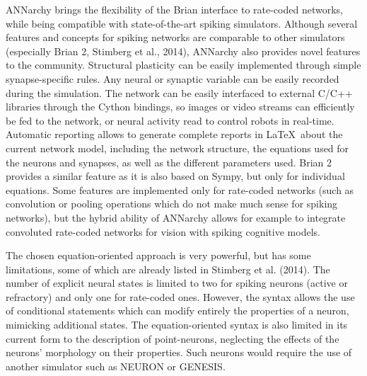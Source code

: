 \documentclass[
  11pt,
  a4paper,
]{scrbook}
\begin{document}
ANNarchy brings the flexibility of the Brian interface to rate-coded
networks, while being compatible with state-of-the-art spiking
simulators. Although several features and concepts for spiking networks
are comparable to other simulators (especially Brian 2, Stimberg et al.,
2014), ANNarchy also provides novel features to the community.
Structural plasticity can be easily implemented through simple
synapse-specific rules. Any neural or synaptic variable can be easily
recorded during the simulation. The network can be easily interfaced to
external C/C++ libraries through the Cython bindings, so images or video
streams can efficiently be fed to the network, or neural activity read
to control robots in real-time. Automatic reporting allows to generate
complete reports in \LaTeX~about the current network model, including
the network structure, the equations used for the neurons and synapses,
as well as the different parameters used. Brian 2 provides a similar
feature as it is also based on Sympy, but only for individual equations.
Some features are implemented only for rate-coded networks (such as
convolution or pooling operations which do not make much sense for
spiking networks), but the hybrid ability of ANNarchy allows for example
to integrate convoluted rate-coded networks for vision with spiking
cognitive models.

The chosen equation-oriented approach is very powerful, but has some
limitations, some of which are already listed in Stimberg et al. (2014).
The number of explicit neural states is limited to two for spiking
neurons (active or refractory) and only one for rate-coded ones.
However, the syntax allows the use of conditional statements which can
modify entirely the properties of a neuron, mimicking additional states.
The equation-oriented syntax is also limited in its current form to the
description of point-neurons, neglecting the effects of the neurons'
morphology on their properties. Such neurons would require the use of
another simulator such as NEURON or GENESIS.
\end{document}
